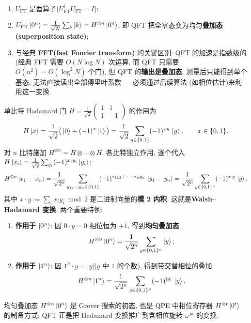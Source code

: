 \documentclass[utf8]{article} %
\numberwithin{equation}{section}   %
\newtheorem{Prop}{\hskip 2em {\color{cyan} 命题}}[subsection]
\newtheorem{Note}{\hskip 2em {\color{red} 注}}[subsection]
\begin{document}
\begin{Prop}[基本性质]
    \begin{enumerate}
        \item $U_{\mathrm{FT}}$ 是酉算子($U_{\mathrm{FT}}^\dagger U_{\mathrm{FT}} = I$);
        \item $U_{\mathrm{FT}} \ket{0^n} = \frac{1}{\sqrt{N}} \sum_{k} \ket{k} = H^{\otimes n}\ket{0^n}$,
        即 QFT 把全零态变为均匀\textbf{叠加态(superposition state)};
        \item 与经典 \textbf{FFT(fast Fourier transform)} 的关键区别: QFT 的加速是指数级的(经典 FFT 需要 $O(N\log N)$ 次运算, 
        而 QFT 只需要 $O(n^2) = O(\log^2 N)$ 个门), 但 QFT 的\textbf{输出是叠加态},
        测量后只能得到单个基态, 无法直接读出全部傅里叶系数 --- 必须通过后续算法
        (如相位估计)来利用这一变换.
    \end{enumerate}
\end{Prop}

\begin{Note}
    单比特 Hadamard 门 $H = \frac{1}{\sqrt{2}}\begin{pmatrix} 1 & 1 \\ 1 & -1 \end{pmatrix}$ 的作用为
    \begin{equation}
        H\ket{x} = \frac{1}{\sqrt{2}}\big(\ket{0} + (-1)^x\ket{1}\big)
        = \frac{1}{\sqrt{2}}\sum_{y \in \{0,1\}} (-1)^{xy}\,\ket{y}, \qquad x \in \{0,1\}.
    \end{equation}
    对 $n$ 比特施加 $H^{\otimes n} = H \otimes \cdots \otimes H$, 各比特独立作用, 
    逐个代入 $H\ket{x_i} = \frac{1}{\sqrt{2}}\sum_{y_i}(-1)^{x_i y_i}\ket{y_i}$:
    \begin{equation}
        H^{\otimes n}\ket{x_1\cdots x_n}
        = \frac{1}{\sqrt{2^n}}\sum_{y_1,\dots,y_n \in \{0,1\}}
           (-1)^{x_1 y_1 + \cdots + x_n y_n}\,\ket{y_1\cdots y_n}
        = \frac{1}{\sqrt{2^n}}\sum_{y \in \{0,1\}^n} (-1)^{x\cdot y}\,\ket{y},
    \end{equation}
    其中 $x \cdot y := \sum_i x_i y_i \bmod 2$ 是二进制向量的\textbf{模 2 内积}.
    这就是\textbf{Walsh--Hadamard 变换}. 两个重要特例:
    \begin{enumerate}
        \item \textbf{作用于 $\ket{0^n}$}: 因 $0 \cdot y = 0$ 相位恒为 $+1$, 得到\textbf{均匀叠加态}
        \[ H^{\otimes n}\ket{0^n} = \frac{1}{\sqrt{2^n}}\sum_{y\in\{0,1\}^n}\ket{y}; \]
        \item \textbf{作用于 $\ket{1^n}$}: 因 $1^n \cdot y = |y|$($y$ 中 $1$ 的个数), 得到带交替相位的叠加
        \[ H^{\otimes n}\ket{1^n} = \frac{1}{\sqrt{2^n}}\sum_{y\in\{0,1\}^n} (-1)^{|y|}\,\ket{y}. \]
    \end{enumerate}
    均匀叠加态 $H^{\otimes n}\ket{0^n}$ 是 Grover 搜索的初态, 也是 QPE 中相位寄存器
    $H^{\otimes t}\ket{0^t}$ 的制备方式; QFT 正是把 Hadamard 变换推广到含相位旋转 $\omega^{jk}$ 的变换.
\end{Note}
\end{document}
